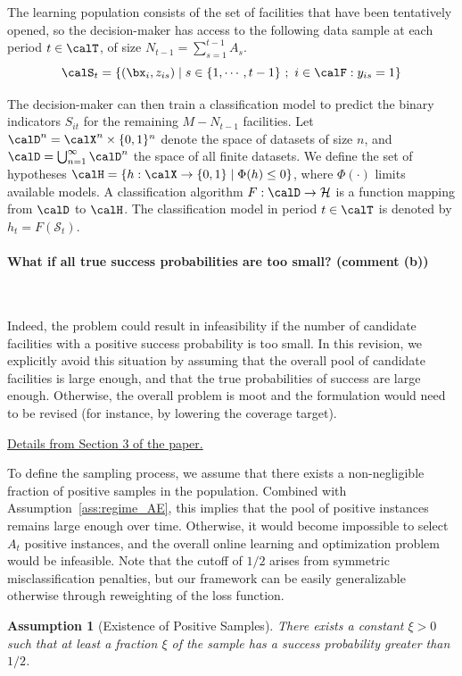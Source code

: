 \documentclass[11pt]{article}
\newtheorem{assumption}{Assumption}[]
\begin{document}
The learning population consists of the set of facilities that have been tentatively opened, so the decision-maker has access to the following data sample at each period $t\in\calT$, of size $N_{t-1}=\sum_{s=1}^{t-1}A_s$.
$$\calS_t=\left\{(\bx_{i},z_{is})\mid s\in\{1,\cdots,t-1\}\ ;\ i\in\calF:y_{is}=1\right\}$$

The decision-maker can then train a classification model to predict the binary indicators $S_{it}$ for the remaining $M-N_{t-1}$ facilities. Let $\calD^n = \calX^n\times\{0,1\}^n$ denote the space of datasets of size $n$, and $\calD = \bigcup_{n=1}^\infty \calD^n$ the space of all finite datasets. We define the set of hypotheses $\calH = \{h: \calX \to \{0,1\} \mid \Phi(h) \leq 0\}$, where $\Phi(\cdot)$ limits available models. A classification algorithm $F: \calD \to \mathcal{H}$ is a function mapping from $ \calD$ to $\calH$. The classification model in period $t\in\calT$ is denoted by $h_t = F(\mathcal{S}_t)$.

\paragraph{What if all true success probabilities are too small? (comment (b))}\

Indeed, the problem could result in infeasibility if the number of candidate facilities with a positive success probability is too small. In this revision, we explicitly avoid this situation by assuming that the overall pool of candidate facilities is large enough, and that the true probabilities of success are large enough. Otherwise, the overall problem is moot and the formulation would need to be revised (for instance, by lowering the coverage target).

\underline{Details from Section 3 of the paper.}

To define the sampling process, we assume that there exists a non-negligible fraction of positive samples in the population. Combined with Assumption~\ref{ass:regime_AE}, this implies that the pool of positive instances remains large enough over time. Otherwise, it would become impossible to select $A_t$ positive instances, and the overall online learning and optimization problem would be infeasible. Note that the cutoff of $1/2$ arises from symmetric misclassification penalties, but our framework can be easily generalizable otherwise through reweighting of the loss function.
\setcounter{assumption}{1}
\begin{assumption}[Existence of Positive Samples]\label{ass:positive_AE} There exists a constant $\xi > 0$ such that at least a fraction $\xi$ of the sample has a success probability greater than $1/2$.
\end{assumption}
\end{document}
